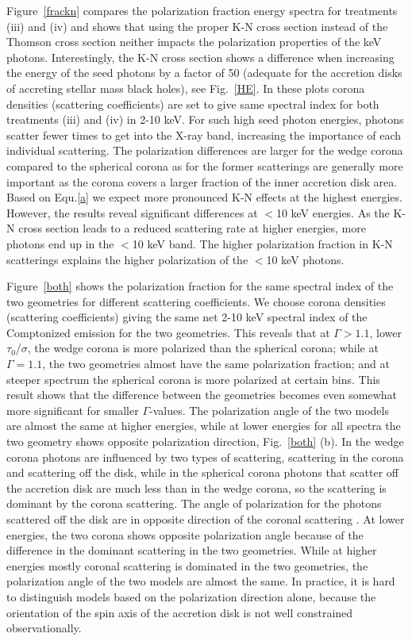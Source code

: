 \documentclass[manuscript]{aastex}
\begin{document}
Figure~\ref{frackn} compares the polarization 
fraction energy spectra for treatments (iii) and (iv) and shows that using the proper 
K-N cross section instead of the Thomson cross section neither impacts the polarization properties 
of the keV photons.
%
Interestingly, the K-N cross section shows a difference when increasing the energy of the 
seed photons by a factor of 50 (adequate for the accretion disks of accreting stellar mass black holes), see Fig.~\ref{HE}. In these plots corona densities (scattering coefficients) are set to give same spectral index for both treatments (iii) and (iv) in 2-10 keV.
For such high seed photon energies, photons scatter fewer times to get into the X-ray band, 
increasing the importance of each individual scattering. 
The polarization differences are larger for the wedge corona compared to the spherical corona as for the former scatterings are generally 
more important as the corona covers a larger fraction of the inner accretion disk area.
Based on Equ.\ref{a} we expect more pronounced K-N effects at the highest energies. However, the results reveal significant differences at $<$10 keV energies. As the K-N cross section leads to a reduced scattering rate at higher energies, more photons end up in the $<$10 keV band. The higher polarization fraction in K-N scatterings explains the higher polarization of the $<$10 keV photons.

Figure~\ref{both} shows the polarization fraction for the same spectral index of the two geometries for different scattering coefficients. We choose corona densities (scattering coefficients) giving the same net 2-10 keV spectral index of the Comptonized emission for the two geometries. This reveals that at $\Gamma>1.1$, lower $\tau_0$/$\sigma$, the wedge corona is more polarized than the spherical corona; while at $\Gamma=1.1$, the two geometries almost have the same polarization fraction; and at steeper spectrum the spherical corona is more polarized at certain  bins. This result shows that the difference between the geometries becomes even somewhat more significant for smaller $\Gamma$-values. The polarization angle of the two models are almost the same at higher energies, while at lower energies for all spectra the two geometry shows opposite polarization direction, Fig.~\ref{both} (b). In the wedge corona photons are influenced by two types of scattering, scattering in the corona and scattering off the disk, while in the spherical corona photons that scatter off the accretion disk are much less than in the wedge corona, so the scattering is dominant by the corona scattering. The angle of polarization for the photons scattered off the disk are in opposite direction of the coronal scattering \citep{sch10}. At lower energies, the two corona shows opposite polarization angle because of the difference in the dominant scattering in the two geometries. While at higher energies mostly coronal scattering is dominated in the two geometries, the polarization angle of the two models are almost the same. In practice, it is hard to distinguish models based on the polarization direction alone, because the orientation of the spin axis of the accretion disk is not well constrained observationally.
\end{document}
